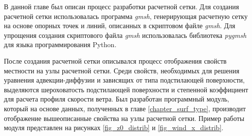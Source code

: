 В данной главе был описан процесс разработки расчетной сетки. Для создания расчетной сетки использовалась программа 
\textit{gmsh}, генерирующая расчетную сетку на основе опорных точек и линий, описанных в скриптовом файле \textit{gmsh}. 
Для упрощения создания скриптового файла \textit{gmsh} использовалась библиотека \textit{pygmsh} для языка 
программирования Python. 

После создания расчетной сетки описывался процесс отображения свойств местности на узлы расчетной сетки. Среди свойств, 
необходимых для решения уравнения адвекции-диффузии и зависящих от типа подстилающей поверхности, выделяются 
шероховатость подстилающей поверхности и степенной коэффициент для расчета профиля скорости ветра. Был разработан 
программный модуль, который на основе данных, полученных в главе \ref{chapter_surf_type}, производит отображение 
вышеописанные свойства на узлы расчетной сетки. Пример работы модуля представлен на рисунках \ref{fig_z0_distrib} и 
\ref{fig_wind_x_distrib}.
